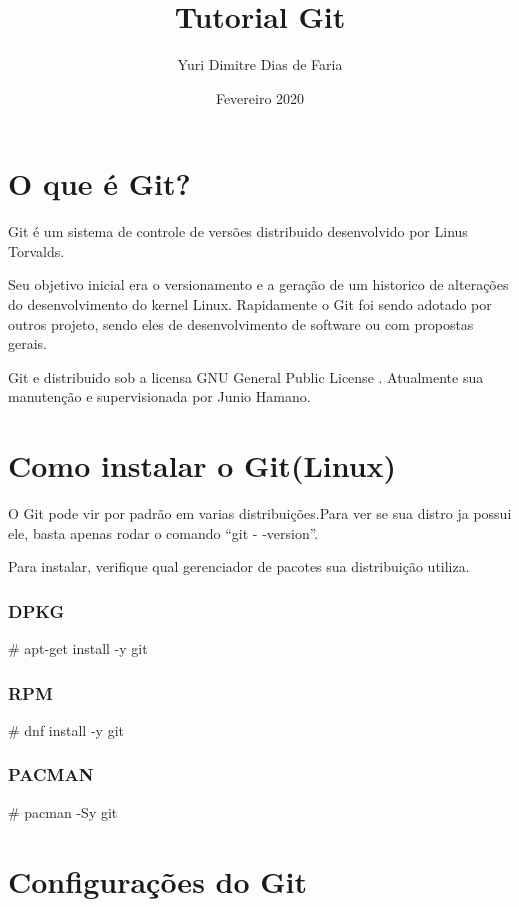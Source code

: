 \documentclass[]{article}
\title{Tutorial Git}
\author{Yuri Dimitre Dias de Faria}
\date{Fevereiro 2020}
\begin{document}
\maketitle    

\section{O que é Git?}


Git é um sistema de controle de versões distribuido desenvolvido por Linus Torvalds.


Seu objetivo inicial era o versionamento e a geração de um historico de alterações do desenvolvimento do kernel Linux.
Rapidamente o Git foi sendo adotado por outros projeto, sendo eles de desenvolvimento de software ou com propostas gerais.


Git e distribuido sob a licensa GNU General Public License \textcite{GNULicense}. Atualmente sua manutenção e supervisionada por Junio Hamano.

\section{Como instalar o Git(Linux)}


O Git pode vir por padrão em varias distribuições.Para ver se sua distro ja possui ele, basta apenas rodar o comando ``git - -version''.


Para instalar, verifique qual gerenciador de pacotes sua distribuição utiliza.

\subsubsection*{DPKG}

\# apt-get install -y git 

\subsubsection*{RPM}

\# dnf install -y git    

\subsubsection*{PACMAN}

\# pacman -Sy git



\section{Configurações do Git}
\end{document}
